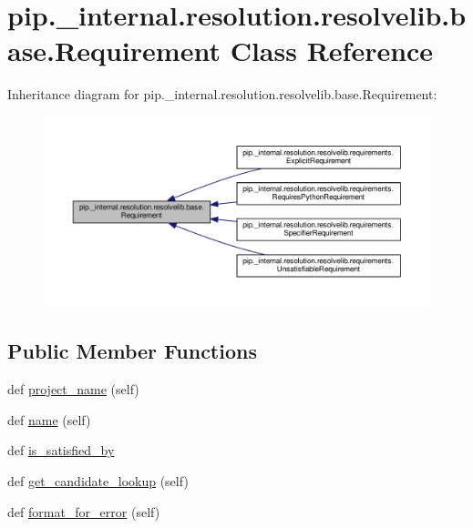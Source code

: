 \hypertarget{classpip_1_1__internal_1_1resolution_1_1resolvelib_1_1base_1_1Requirement}{}\section{pip.\+\_\+internal.\+resolution.\+resolvelib.\+base.\+Requirement Class Reference}
\label{classpip_1_1__internal_1_1resolution_1_1resolvelib_1_1base_1_1Requirement}


Inheritance diagram for pip.\+\_\+internal.\+resolution.\+resolvelib.\+base.\+Requirement\+:
\nopagebreak
\begin{figure}[H]
\begin{center}
\leavevmode
\includegraphics[width=350pt]{classpip_1_1__internal_1_1resolution_1_1resolvelib_1_1base_1_1Requirement__inherit__graph}
\end{center}
\end{figure}
\subsection*{Public Member Functions}
\begin{DoxyCompactItemize}
\item 
def \hyperlink{classpip_1_1__internal_1_1resolution_1_1resolvelib_1_1base_1_1Requirement_aded87c50aa984abf5a73e7868becb448}{project\+\_\+name} (self)
\item 
def \hyperlink{classpip_1_1__internal_1_1resolution_1_1resolvelib_1_1base_1_1Requirement_a21e4edd1c8aa5ce147a3399bf3c8d7b0}{name} (self)
\item 
def \hyperlink{classpip_1_1__internal_1_1resolution_1_1resolvelib_1_1base_1_1Requirement_ad8b6b31588ca69cf5c9bb141bea7f1c0}{is\+\_\+satisfied\+\_\+by}
\item 
def \hyperlink{classpip_1_1__internal_1_1resolution_1_1resolvelib_1_1base_1_1Requirement_ac2a1beb885bee0964c29dbd932286ae2}{get\+\_\+candidate\+\_\+lookup} (self)
\item 
def \hyperlink{classpip_1_1__internal_1_1resolution_1_1resolvelib_1_1base_1_1Requirement_aef7457c06bbdb40b406875b1ddc9bd11}{format\+\_\+for\+\_\+error} (self)
\end{DoxyCompactItemize}


